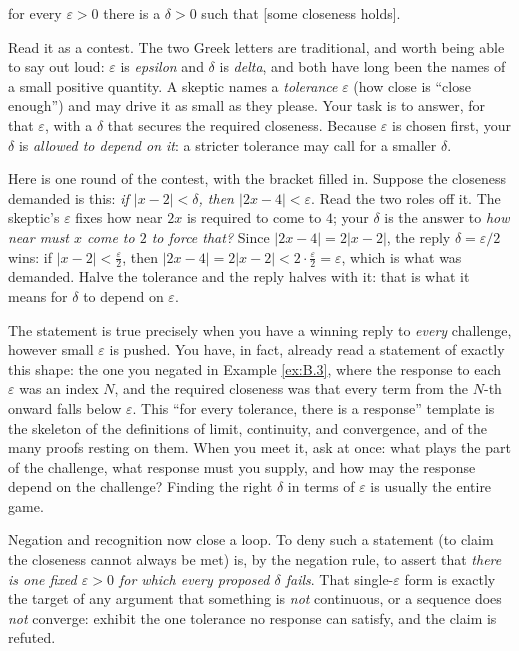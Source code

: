 \documentclass[a4paper,12pt,oneside]{memoir}
\begin{document}
\begin{centerstatement}
for every \(\varepsilon > 0\) there is a \(\delta > 0\) such that [some closeness holds].
\end{centerstatement}
Read it as a contest. The two Greek letters are traditional, and worth being able to say out loud: \(\varepsilon\) is \emph{epsilon} and \(\delta\) is \emph{delta}, and both have long been the names of a small positive quantity. A skeptic names a \emph{tolerance} \(\varepsilon\) (how close is “close enough”) and may drive it as small as they please. Your task is to answer, for that \(\varepsilon\), with a \(\delta\) that secures the required closeness. Because \(\varepsilon\) is chosen first, your \(\delta\) is \emph{allowed to depend on it}: a stricter tolerance may call for a smaller \(\delta\).

Here is one round of the contest, with the bracket filled in. Suppose the closeness demanded is this: \emph{if \(|x - 2| < \delta\), then \(|2x - 4| < \varepsilon\)}. Read the two roles off it. The skeptic’s \(\varepsilon\) fixes how near \(2x\) is required to come to \(4\); your \(\delta\) is the answer to \emph{how near must \(x\) come to \(2\) to force that?} Since \(|2x - 4| = 2|x - 2|\), the reply \(\delta = \varepsilon/2\) wins: if \(|x - 2| < \tfrac{\varepsilon}{2}\), then \(|2x - 4| = 2|x - 2| < 2 \cdot \tfrac{\varepsilon}{2} = \varepsilon\), which is what was demanded. Halve the tolerance and the reply halves with it: that is what it means for \(\delta\) to depend on \(\varepsilon\).

The statement is true precisely when you have a winning reply to \emph{every} challenge, however small \(\varepsilon\) is pushed. You have, in fact, already read a statement of exactly this shape: the one you negated in Example \ref{ex:B.3}, where the response to each \(\varepsilon\) was an index \(N\), and the required closeness was that every term from the \(N\)-th onward falls below \(\varepsilon\). This “for every tolerance, there is a response” template is the skeleton of the definitions of limit, continuity, and convergence, and of the many proofs resting on them. When you meet it, ask at once: what plays the part of the challenge, what response must you supply, and how may the response depend on the challenge? Finding the right \(\delta\) in terms of \(\varepsilon\) is usually the entire game.

Negation and recognition now close a loop. To deny such a statement (to claim the closeness cannot always be met) is, by the negation rule, to assert that \emph{there is one fixed \(\varepsilon > 0\) for which every proposed \(\delta\) fails}. That single-\(\varepsilon\) form is exactly the target of any argument that something is \emph{not} continuous, or a sequence does \emph{not} converge: exhibit the one tolerance no response can satisfy, and the claim is refuted.
\end{document}
